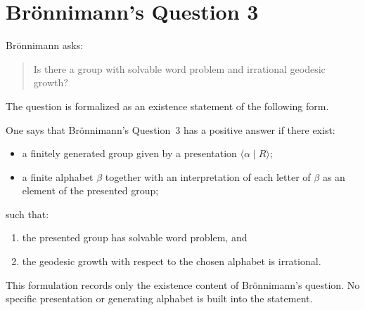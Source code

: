 \section{Br\"onnimann's Question 3}
\label{sec:Question}

Br\"onnimann asks:
\begin{quote}
Is there a group with solvable word problem and irrational geodesic growth?
\end{quote}

The question is formalized as an existence statement of the following form.

\begin{definition}
One says that Br\"onnimann's Question~3 has a positive answer if there exist:
\begin{itemize}
  \item a finitely generated group given by a presentation $\langle \alpha \mid R \rangle$;
  \item a finite alphabet $\beta$ together with an interpretation of each letter of $\beta$ as an
    element of the presented group;
\end{itemize}
such that:
\begin{enumerate}[label=(\roman*)]
  \item the presented group has solvable word problem, and
  \item the geodesic growth with respect to the chosen alphabet is irrational.
\end{enumerate}
\end{definition}

This formulation records only the existence content of Br\"onnimann's question. No specific
presentation or generating alphabet is built into the statement.
